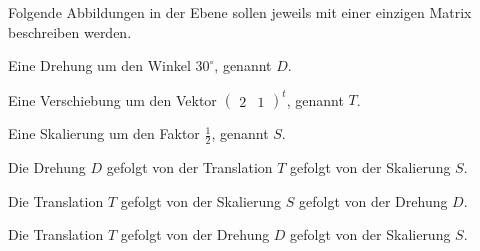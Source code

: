 Folgende Abbildungen in der Ebene sollen jeweils mit einer 
einzigen Matrix beschreiben werden.
\begin{teilaufgaben}
\item
Eine Drehung um den Winkel $30^\circ$, genannt $D$.
\item
Eine Verschiebung um den Vektor $\begin{pmatrix}2&1\end{pmatrix}^t$,
genannt $T$.
\item
Eine Skalierung um den Faktor $\frac12$, genannt $S$.
\item
Die Drehung $D$ gefolgt von der Translation $T$ gefolgt von der Skalierung $S$.
\item
Die Translation $T$ gefolgt von der Skalierung $S$ gefolgt von der Drehung $D$.
\item
Die Translation $T$ gefolgt von der Drehung $D$ gefolgt von der Skalierung $S$.
\end{teilaufgaben}


